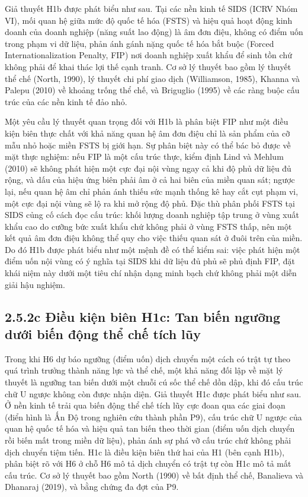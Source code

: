 \documentclass[
  a4paper,
  13pt]{extreport}
\begin{document}
Giả thuyết H1b được phát biểu như sau. Tại các nền kinh tế SIDS (ICRV
Nhóm VI), mối quan hệ giữa mức độ quốc tế hóa (FSTS) và hiệu quả hoạt
động kinh doanh của doanh nghiệp (năng suất lao động) là âm đơn điệu,
không có điểm uốn trong phạm vi dữ liệu, phản ánh gánh nặng quốc tế hóa
bắt buộc (Forced Internationalization Penalty, FIP) nơi doanh nghiệp
xuất khẩu để sinh tồn chứ không phải để khai thác lợi thế cạnh tranh. Cơ
sở lý thuyết bao gồm lý thuyết thể chế (North, 1990), lý thuyết chi phí
giao dịch (Williamson, 1985), Khanna và Palepu (2010) về khoảng trống
thể chế, và Briguglio (1995) về các ràng buộc cấu trúc của các nền kinh
tế đảo nhỏ.

Một yêu cầu lý thuyết quan trọng đối với H1b là phân biệt FIP như một
điều kiện biên thực chất với khả năng quan hệ âm đơn điệu chỉ là sản
phẩm của cỡ mẫu nhỏ hoặc miền FSTS bị giới hạn. Sự phân biệt này có thể
bác bỏ được về mặt thực nghiệm: nếu FIP là một cấu trúc thực, kiểm định
Lind và Mehlum (2010) sẽ không phát hiện một cực đại nội vùng ngay cả
khi độ phủ dữ liệu đủ rộng, và dấu của hiệu ứng biên phải âm ở cả hai
biên của miền quan sát; ngược lại, nếu quan hệ âm chỉ phản ánh thiếu sức
mạnh thống kê hay cắt cụt phạm vi, một cực đại nội vùng sẽ lộ ra khi mở
rộng độ phủ. Đặc thù phân phối FSTS tại SIDS củng cố cách đọc cấu trúc:
khối lượng doanh nghiệp tập trung ở vùng xuất khẩu cao do cưỡng bức xuất
khẩu chứ không phải ở vùng FSTS thấp, nên một kết quả âm đơn điệu không
thể quy cho việc thiếu quan sát ở đuôi trên của miền. Do đó H1b được
phát biểu như một mệnh đề có thể kiểm sai: việc phát hiện một điểm uốn
nội vùng có ý nghĩa tại SIDS khi dữ liệu đủ phủ sẽ phủ định FIP, đặt
khái niệm này dưới một tiêu chí nhận dạng minh bạch chứ không phải một
diễn giải hậu nghiệm.

\hypertarget{c-ux111iux1ec1u-kiux1ec7n-biuxean-h1c-tan-biux1ebfn-ngux1b0ux1ee1ng-dux1b0ux1edbi-biux1ebfn-ux111ux1ed9ng-thux1ec3-chux1ebf-tuxedch-lux169y}{%
\subsection{2.5.2c Điều kiện biên H1c: Tan biến ngưỡng dưới biến động
thể chế tích
lũy}\label{c-ux111iux1ec1u-kiux1ec7n-biuxean-h1c-tan-biux1ebfn-ngux1b0ux1ee1ng-dux1b0ux1edbi-biux1ebfn-ux111ux1ed9ng-thux1ec3-chux1ebf-tuxedch-lux169y}}

Trong khi H6 dự báo ngưỡng (điểm uốn) dịch chuyển một cách có trật tự
theo quá trình trưởng thành năng lực và thể chế, một khả năng đối lập về
mặt lý thuyết là ngưỡng tan biến dưới một chuỗi cú sốc thể chế dồn dập,
khi đó cấu trúc chữ U ngược không còn được nhận diện. Giả thuyết H1c
được phát biểu như sau. Ở nền kinh tế trải qua biến động thể chế tích
lũy cực đoan qua các giai đoạn (điển hình là Ấn Độ trong nghiên cứu
thành phần P9), cấu trúc chữ U ngược của quan hệ quốc tế hóa và hiệu quả
tan biến theo thời gian (điểm uốn dịch chuyển rồi biến mất trong miền dữ
liệu), phản ánh sự phá vỡ cấu trúc chứ không phải dịch chuyển tiệm tiến.
H1c là điều kiện biên thứ hai của H1 (bên cạnh H1b), phân biệt rõ với H6
ở chỗ H6 mô tả dịch chuyển có trật tự còn H1c mô tả mất cấu trúc. Cơ sở
lý thuyết bao gồm North (1990) về bất định thể chế, Banalieva và
Dhanaraj (2019), và bằng chứng đa đợt của P9.
\end{document}
